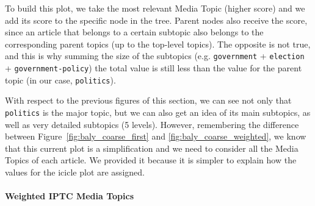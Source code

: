 To build this plot, we take the most relevant Media Topic (higher score) and we add its score to the specific node in the tree. Parent nodes also receive the score, since an article that belongs to a certain subtopic also belongs to the corresponding parent topics (up to the top-level topics). The opposite is not true, and this is why summing the size of the subtopics (e.g. \texttt{government} + \texttt{election} + \texttt{government-policy}) the total value is still less than the value for the parent topic (in our case, \texttt{politics}).


With respect to the previous figures of this section, we can see not only that \texttt{politics} is the major topic, but we can also get an idea of its main subtopics, as well as very detailed subtopics (5 levels).
However, remembering the difference between Figure~\ref{fig:baly_coarse_first} and \ref{fig:baly_coarse_weighted}, we know that this current plot is a simplification and we need to consider all the Media Topics of each article.
We provided it because it is simpler to explain how the values for the icicle plot are assigned.




\paragraph{Weighted IPTC Media Topics}

